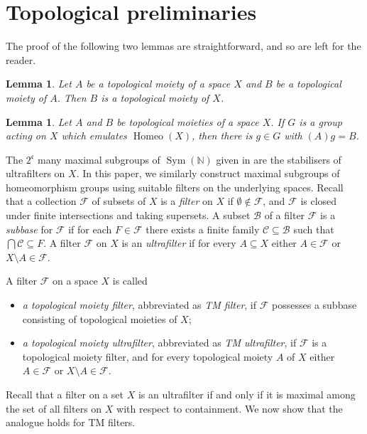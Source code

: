 \documentclass[11pt]{amsart}
\newtheorem{lemma}[theorem]{Lemma}
\theoremstyle{definition}
\newcommand{\Homeo}{\operatorname{Homeo}}
\newcommand{\N}{\mathbb N}
\newcommand{\F}{\mathcal F}
\newcommand{\Sym}{\operatorname{Sym}}
\begin{document}
\section{Topological preliminaries}\label{section:preliminaries}

The proof of the following two lemmas are straightforward, and so are left for the reader.
\begin{lemma}\label{trans}
Let $A$ be a topological moiety of a space $X$ and $B$ be a topological moiety of $A$. Then $B$ is a topological moiety of $X$.    
\end{lemma}

\begin{lemma}\label{transactonmoieties}
Let $A$ and \(B\) be topological moieties of a space $X$. If \(G\) is a group acting on \(X\) which emulates \(\Homeo(X)\), then there is \(g\in G\) with \((A)g=B\). 
\end{lemma}


The $2^{\mathfrak c}$ many maximal subgroups of $\Sym(\N)$ given in \cite{subgroups_macpherson_neumann} are the stabilisers of ultrafilters on $X$. In this paper, we similarly construct maximal subgroups of homeomorphism groups using suitable filters on the underlying spaces. Recall that a collection $\mathcal{F}$ of subsets of $X$ is a \emph{filter} on $X$ if  $\emptyset \notin \mathcal{F}$, and $\F$ is closed under finite intersections and taking supersets. A subset $\mathcal B$ of a filter $\F$ is a {\em subbase} for $\F$ if for each $F\in \F$ there exists a finite family $\mathcal C\subseteq \mathcal B$ such that $\bigcap \mathcal C\subseteq F$. A filter $\mathcal{F}$ on $X$ is an \emph{ultrafilter} if for every $A \subseteq X$ either $A \in \mathcal{F}$ or $X \setminus A \in \mathcal{F}$. 

A filter $\F$ on a space $X$ is called
\begin{itemize}
\item {\em a topological moiety filter}, abbreviated as {\em TM filter}, if $\F$ possesses a subbase consisting of topological moieties of $X$;
\item {\em a topological moiety ultrafilter}, abbreviated as {\em TM ultrafilter}, if $\F$ is a topological moiety filter, and for every topological moiety $A$ of $X$ either $A\in \F$ or $X\setminus A\in\F$.
\end{itemize}

Recall that a filter on a set $X$ is an ultrafilter if and only if it is maximal among the set of all filters on $X$ with respect to containment. We now show that the analogue holds for TM filters. 
\end{document}
